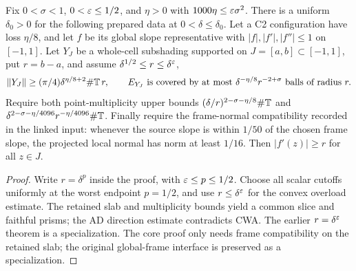 \begin{lemma}
\label{lem:large-slope-prepared}
\leanok
{}
Fix $0<\sigma<1$, $0<\varepsilon\leq1/2$, and $\eta>0$ with
$1000\eta\leq\varepsilon\sigma^2$. There is a uniform $\delta_0>0$
for the following prepared data at $0<\delta\leq\delta_0$.
Let a C2 configuration have loss
$\eta/8$, and let $f$ be its global slope representative with
$|f|,|f'|,|f''|\leq1$ on $[-1,1]$. Let $Y_J$ be a whole-cell
subshading supported on $J=[a,b]\subset[-1,1]$, put $r=b-a$, and
assume $\delta^{1/2}\leq r\leq\delta^\varepsilon$,
\[
 \|Y_J\|\geq(\pi/4)\delta^{\eta/8+2}\#\mathbb{T}\,r,
 \qquad E_{Y_J}\text{ is covered by at most }
 \delta^{-\eta/8}r^{-2+\sigma}\text{ balls of radius }r.
\]
Require both point-multiplicity upper bounds
$(\delta/r)^{2-\sigma-\eta/8}\#\mathbb{T}$ and
$\delta^{2-\sigma-\eta/4096}r^{-\eta/4096}\#\mathbb{T}$.
Finally require the frame-normal compatibility recorded in the linked
input: whenever the source slope is within $1/50$ of the chosen frame
slope, the projected local normal has norm at least $1/16$.
Then $|f'(z)|\geq r$ for all $z\in J$.
\end{lemma}
\begin{proof}
\leanok
Write $r=\delta^p$ inside the proof, with $\varepsilon\leq p\leq1/2$.
Choose all scalar cutoffs uniformly at the worst endpoint $p=1/2$,
and use $r\leq\delta^\varepsilon$ for the convex overload estimate.
The retained slab and multiplicity bounds yield a common slice and
faithful prisms; the AD direction estimate contradicts CWA.
The earlier $r=\delta^\varepsilon$ theorem is a specialization.
The core proof only needs frame compatibility on the retained slab;
the original global-frame interface is preserved as a specialization.
\end{proof}

